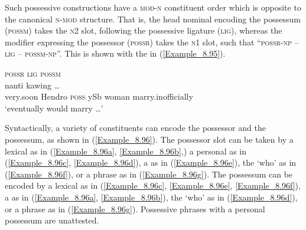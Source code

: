 Such possessive constructions have a \textsc{mod-n} constituent order which is opposite to the canonical \textsc{n-mod} structure. That is, the head nominal encoding the possessum (\textsc{possm}) takes the \textsc{n2} slot, following the possessive ligature (\textsc{lig}), whereas the modifier expressing the possessor (\textsc{possr}) takes the \textsc{n1} slot, such that ``\textsc{possr}{}-\textsc{np} – \textsc{lig} – \textsc{possm}{}-\textsc{np}''. This is shown with the  in (\ref{Example_8.95}).


\ea
\label{Example_8.95}
\hspace{45pt} \textsc{possr} \hspace{10pt} \textsc{lig} \hspace{10pt}  { \textsc{possm}} \\ %
\gll  nanti          kawing  {\ldots}\\
 very.soon  Hendro  \textsc{poss}  ySb  woman  marry.inofficially  \\
\glt 
‘eventually  would marry {\ldots}’ \textstyleExampleSource{[081006-028-CvEx.0007]}
\z


Syntactically, a variety of constituents can encode the possessor and the possessum, as shown in (\ref{Example_8.96}). The possessor slot can be taken by a lexical  as in (\ref{Example_8.96a}, \ref{Example_8.96b},) a personal  as in (\ref{Example_8.96c}, \ref{Example_8.96d}), a  as in (\ref{Example_8.96e}), the   ‘who’ as in (\ref{Example_8.96f}), or a  phrase as in (\ref{Example_8.96g}). The possessum can be encoded by a lexical  as in (\ref{Example_8.96c}, \ref{Example_8.96e}, \ref{Example_8.96f}), a  as in (\ref{Example_8.96a}, \ref{Example_8.96b}), the   ‘who’ as in (\ref{Example_8.96d}), or a  phrase as in (\ref{Example_8.96g}). Possessive  phrases with a personal  possessum are unattested.



